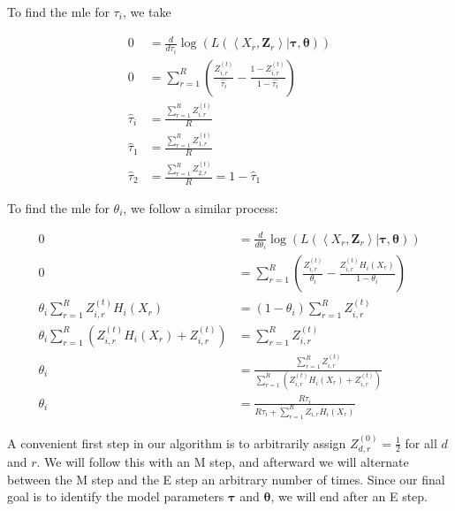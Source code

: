   To find the mle for $\tau_i$, we take

  \begin{align}
    0 &= \frac{d}{d \tau_i} \log(L(\left< X_r, \bm{Z}_r \right> |
                                   \bm{\tau}, \bm{\theta})) \\
    0 &=
        \sum_{r=1}^{R}
          \left(
            \frac{Z_{i, r}^{(t)}}{\hat{\tau_i}} -
            \frac{1 - Z_{i, r}^{(t)}}{1 - \hat{\tau_i}}
          \right) \\
    \label{eq:tau_i_pre_simplification}
    \hat{\tau}_i &= \frac{\sum_{r=1}^{R} Z_{i, r}^{(t)}}{R} \\
    \hat{\tau}_1 &= \frac{\sum_{r=1}^{R} Z_{1, r}^{(t)}}{R} \\
    \hat{\tau}_2 &= \frac{\sum_{r=1}^{R} Z_{2, r}^{(t)}}{R} = 1 - \hat{\tau}_1
  \end{align}

  To find the mle for $\theta_i$, we follow a similar process:

  \begin{align}
    0 &= \frac{d}{d \theta_i} \log(L(\left< X_r, \bm{Z}_r \right> |
                                     \bm{\tau}, \bm{\theta})) \\
    0 &=
      \sum_{r=1}^{R}
        \left(
          \frac{Z_{i, r}^{(t)}}{\theta_i} -
          \frac{Z_{i, r}^{(t)} H_i(X_r)}{1 - \theta_i}
        \right) \\
    \theta_i \sum_{r=1}^{R} Z_{i, r}^{(t)} H_i(X_r) &=
      (1 - \theta_i) \sum_{r=1}^{R} Z_{i, r}^{(t)} \\
    \theta_i
      \sum_{r=1}^{R}
        \left( Z_{i, r}^{(t)} H_i(X_r) + Z_{i, r}^{(t)}
        \right) &= \sum_{r=1}^{R} Z_{i, r}^{(t)} \\
    \label{eq:theta_i_pre_simplification}
    \theta_i &=
      \frac{\sum_{r=1}^{R} Z_{i, r}^{(t)}}
           {\sum_{r=1}^{R} \left(
              Z_{i, r}^{(t)} H_i(X_r) + Z_{i, r}^{(t)} \right)} \\
    \label{eq:theta_i_post_simplification}
    \theta_i &= \frac{R \tau_i}{R \tau_i + \sum_{r=1}^{R} Z_{i, r} H_i(X_r)}
  \end{align}

  A convenient first step in our algorithm is to arbitrarily assign $Z_{d,
  r}^{(0)} = \frac{1}{2}$ for all $d$ and $r$. We will follow this with an M
  step, and afterward we will alternate between the M step and the E step an
  arbitrary number of times. Since our final goal is to identify the model
  parameters $\bm{\tau}$ and $\bm{\theta}$, we will end after an E step.

